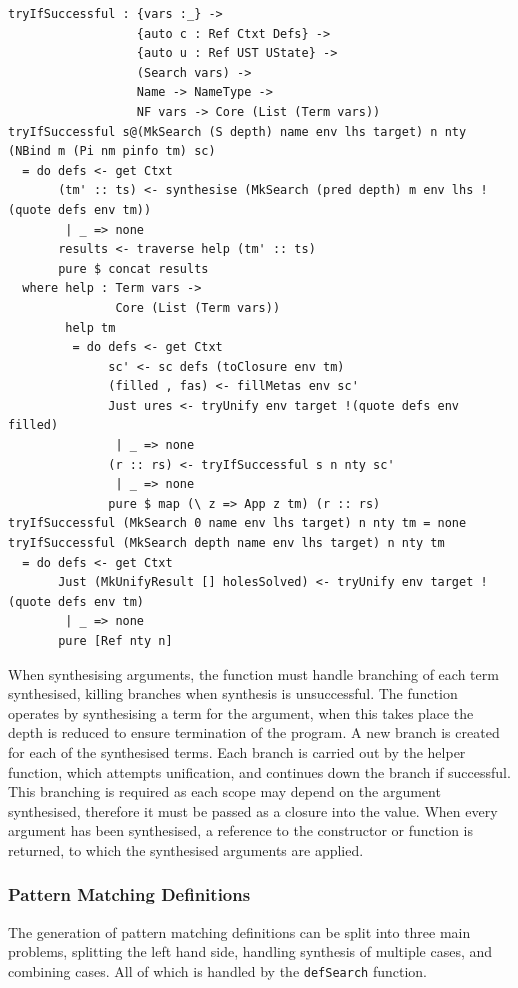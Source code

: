 \documentclass[a4paper]{article}
\begin{document}
\begin{center}
  \begin{verbatim}
tryIfSuccessful : {vars :_} ->
                  {auto c : Ref Ctxt Defs} ->
                  {auto u : Ref UST UState} ->
                  (Search vars) ->
                  Name -> NameType ->
                  NF vars -> Core (List (Term vars))
tryIfSuccessful s@(MkSearch (S depth) name env lhs target) n nty (NBind m (Pi nm pinfo tm) sc)
  = do defs <- get Ctxt
       (tm' :: ts) <- synthesise (MkSearch (pred depth) m env lhs !(quote defs env tm))
        | _ => none
       results <- traverse help (tm' :: ts)
       pure $ concat results
  where help : Term vars ->
               Core (List (Term vars))
        help tm
         = do defs <- get Ctxt
              sc' <- sc defs (toClosure env tm)
              (filled , fas) <- fillMetas env sc'
              Just ures <- tryUnify env target !(quote defs env filled)
               | _ => none 
              (r :: rs) <- tryIfSuccessful s n nty sc'
               | _ => none
              pure $ map (\ z => App z tm) (r :: rs)
tryIfSuccessful (MkSearch 0 name env lhs target) n nty tm = none
tryIfSuccessful (MkSearch depth name env lhs target) n nty tm 
  = do defs <- get Ctxt
       Just (MkUnifyResult [] holesSolved) <- tryUnify env target !(quote defs env tm)
        | _ => none  
       pure [Ref nty n]
  \end{verbatim}
\end{center}
       
When synthesising arguments, the function must handle 
branching of each term synthesised, killing branches when synthesis is unsuccessful.
The function operates by synthesising a term for the argument, when
this takes place the depth is reduced to ensure termination of the
program. A new branch is created for each of the synthesised terms.
Each branch is carried out by the helper function, which attempts unification,
and continues down the branch if successful. This branching is required
as each scope may depend on the argument synthesised, therefore it must be passed
as a closure into the value. When every argument has been synthesised,
a reference to the constructor or function is returned, to which the
synthesised arguments are applied.

\subsubsection{Pattern Matching Definitions}

The generation of pattern matching definitions can be split into three main
problems, splitting the left hand side, handling synthesis of multiple
cases, and combining cases. All of which is handled by the
\texttt{defSearch} function.
\end{document}
